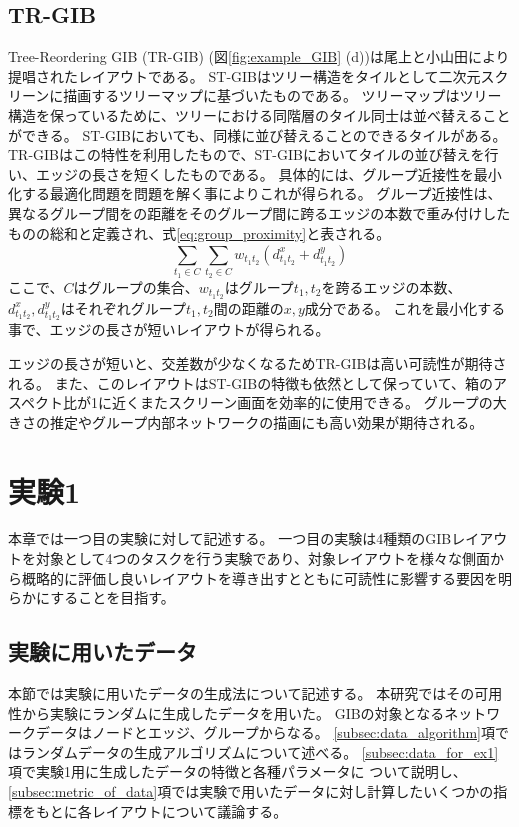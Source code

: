 \documentclass{kuee}
\begin{document}
\section{TR-GIB}
Tree-Reordering GIB (TR-GIB) (図\ref{fig:example_GIB} (d))は尾上と小山田により提唱されたレイアウトである。
ST-GIBはツリー構造をタイルとして二次元スクリーンに描画するツリーマップに基づいたものである。
ツリーマップはツリー構造を保っているために、ツリーにおける同階層のタイル同士は並べ替えることができる。
ST-GIBにおいても、同様に並び替えることのできるタイルがある。
TR-GIBはこの特性を利用したもので、ST-GIBにおいてタイルの並び替えを行い、エッジの長さを短くしたものである。
具体的には、グループ近接性を最小化する最適化問題を問題を解く事によりこれが得られる。
グループ近接性は、異なるグループ間をの距離をそのグループ間に跨るエッジの本数で重み付けしたものの総和と定義され、式\ref{eq:group_proximity}と表される。
\begin{equation}
\label{eq:group_proximity}
  \sum_{t_1 \in C}^{} \sum_{t_2 \in C}^{} w_{t_1 t_2}(d_{t_1 t_2}^x + d_{t_1 t_2}^y)
\end{equation}
ここで、$C$はグループの集合、$w_{t_1 t_2}$はグループ$t_1, t_2$を跨るエッジの本数、$d_{t_1 t_2}^x, d_{t_1 t_2}^y$はそれぞれグループ$t_1, t_2$間の距離の$x, y$成分である。
これを最小化する事で、エッジの長さが短いレイアウトが得られる。

エッジの長さが短いと、交差数が少なくなるためTR-GIBは高い可読性が期待される。
また、このレイアウトはST-GIBの特徴も依然として保っていて、箱のアスペクト比が1に近くまたスクリーン画面を効率的に使用できる。
グループの大きさの推定やグループ内部ネットワークの描画にも高い効果が期待される。

\chapter{実験1}
\label{chap:experiment1}
本章では一つ目の実験に対して記述する。
一つ目の実験は4種類のGIBレイアウトを対象として4つのタスクを行う実験であり、対象レイアウトを様々な側面から概略的に評価し良いレイアウトを導き出すとともに可読性に影響する要因を明らかにすることを目指す。

\section{実験に用いたデータ}
\label{sec:data}
本節では実験に用いたデータの生成法について記述する。
本研究ではその可用性から実験にランダムに生成したデータを用いた。
GIBの対象となるネットワークデータはノードとエッジ、グループからなる。
\ref{subsec:data_algorithm}項ではランダムデータの生成アルゴリズムについて述べる。
\ref{subsec:data_for_ex1}項で実験1用に生成したデータの特徴と各種パラメータに
ついて説明し、\ref{subsec:metric_of_data}項では実験で用いたデータに対し計算したいくつかの指標をもとに各レイアウトについて議論する。
\end{document}
